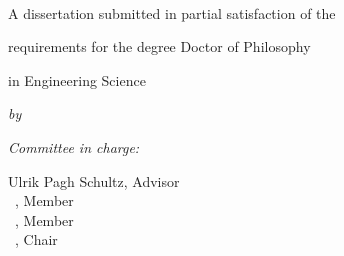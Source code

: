 \begin{titlepage}
	\centering
	{\large \publisher\par}
	~

	\vspace{36pt}
	{\Huge{}\selectfont\bfseries\booktitle\par}
	\vspace{24pt}

	{\large A dissertation submitted in partial satisfaction of the\par\vspace*{.8ex}
	requirements for the degree Doctor of Philosophy\par\vspace*{.8ex}
	in Engineering Science}

	\vspace{12pt}
	{\large\itshape by\par}
	\vspace{6pt}
	{\Large\itshape \authorname\par}
	\vspace{24pt}

	{\begin{flushleft}{\itshape Committee in charge:}
		\begin{multicols}{2}
			{Ulrik Pagh Schultz, Advisor\\\vspace*{.8ex}
			~, Member\\\vspace*{.8ex}
			~, Member\\\vspace*{.8ex}
			~, Chair\\
			}\par
			\columnbreak
			{~\\
			~\\
			~}\par
		\end{multicols}
		\vspace{6pt}
		\begin{multicols}{2}
		~\\\columnbreak {\itshape %
		                }
		\end{multicols}	
	\end{flushleft}}

	{\large \editionyear{}}
\end{titlepage}

